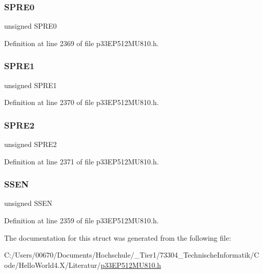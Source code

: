 \subsubsection{\texorpdfstring{S\+P\+R\+E0}{SPRE0}}
{\footnotesize\ttfamily unsigned S\+P\+R\+E0}



Definition at line 2369 of file p33\+E\+P512\+M\+U810.\+h.

\mbox{\label{structtag_s_p_i4_c_o_n1_b_i_t_s_aa10bf0541cfc6de804735f5e3beca089}} 
\subsubsection{\texorpdfstring{S\+P\+R\+E1}{SPRE1}}
{\footnotesize\ttfamily unsigned S\+P\+R\+E1}



Definition at line 2370 of file p33\+E\+P512\+M\+U810.\+h.

\mbox{\label{structtag_s_p_i4_c_o_n1_b_i_t_s_ad98c0587f19b608e8e40e67d2327634c}} 
\subsubsection{\texorpdfstring{S\+P\+R\+E2}{SPRE2}}
{\footnotesize\ttfamily unsigned S\+P\+R\+E2}



Definition at line 2371 of file p33\+E\+P512\+M\+U810.\+h.

\mbox{\label{structtag_s_p_i4_c_o_n1_b_i_t_s_ae77e6e9fafcdae4e5b7f261d00459ade}} 
\subsubsection{\texorpdfstring{S\+S\+EN}{SSEN}}
{\footnotesize\ttfamily unsigned S\+S\+EN}



Definition at line 2359 of file p33\+E\+P512\+M\+U810.\+h.



The documentation for this struct was generated from the following file\+:\begin{DoxyCompactItemize}
\item 
C\+:/\+Users/00670/\+Documents/\+Hochschule/\+\_\+\+Tier1/73304\+\_\+\+Technische\+Informatik/\+Code/\+Hello\+World4.\+X/\+Literatur/\hyperlink{p33_e_p512_m_u810_8h}{p33\+E\+P512\+M\+U810.\+h}\end{DoxyCompactItemize}
